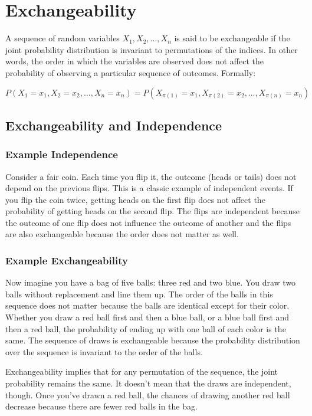 \documentclass{article}
\begin{document}
\section{Exchangeability}
A sequence of random variables \( X_1, X_2, \ldots, X_n \) is said to be exchangeable if the joint probability distribution is invariant to permutations of the indices. In other words, the order in which the variables are observed does not affect the probability of observing a particular sequence of outcomes. Formally:

\[ P(X_1 = x_1, X_2 = x_2, \ldots, X_n = x_n) = P(X_{\pi(1)} = x_1, X_{\pi(2)} = x_2, \ldots, X_{\pi(n)} = x_n) \]

\subsection{Exchangeability and Independence}
\subsubsection{Example Independence}
Consider a fair coin. Each time you flip it, the outcome (heads or tails) does not depend on the previous flips. This is a classic example of independent events. If you flip the coin twice, getting heads on the first flip does not affect the probability of getting heads on the second flip. The flips are independent because the outcome of one flip does not influence the outcome of another and the flips are also exchangeable because  the order does not matter as well.

\subsubsection{Example Exchangeability}
Now imagine you have a bag of five balls: three red and two blue. You draw two balls without replacement and line them up. The order of the balls in this sequence does not matter because the balls are identical except for their color. Whether you draw a red ball first and then a blue ball, or a blue ball first and then a red ball, the probability of ending up with one ball of each color is the same. The sequence of draws is exchangeable because the probability distribution over the sequence is invariant to the order of the balls.

Exchangeability implies that for any permutation of the sequence, the joint probability remains the same. It doesn't mean that the draws are independent, though. Once you've drawn a red ball, the chances of drawing another red ball decrease because there are fewer red balls in the bag.
\end{document}
